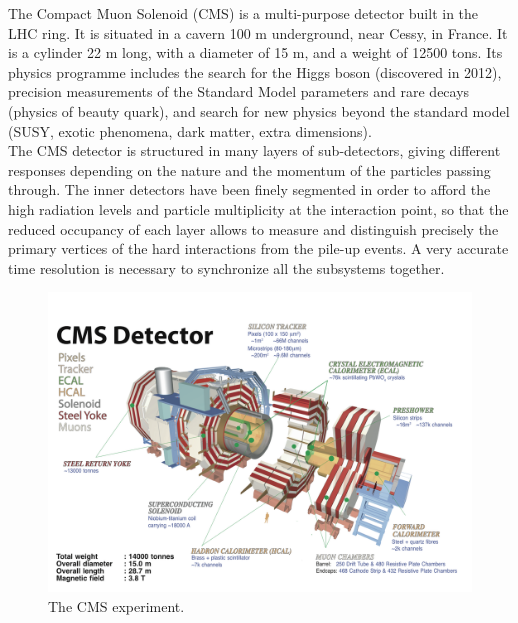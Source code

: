 The Compact Muon Solenoid (CMS) is a multi-purpose detector built in the LHC ring. It is situated in a cavern 100 m underground, near Cessy, in France. It is a cylinder 22 m long, with a diameter of 15 m, and a weight of 12500 tons. Its physics programme includes the search for the Higgs boson (discovered in 2012), precision measurements of the Standard Model parameters and rare decays (physics of beauty quark), and search for new physics beyond the standard model (SUSY, exotic phenomena, dark matter, extra dimensions).\\
The CMS detector is structured in many layers of sub-detectors, giving different responses depending on the nature and the momentum of the particles passing through. The inner detectors have been finely segmented in order to afford the high radiation levels and particle multiplicity at the interaction point, so that the reduced occupancy of each layer allows to measure and distinguish precisely the primary vertices of the hard interactions from the pile-up events. A very accurate time resolution is necessary to synchronize all the subsystems together.\\

\begin{figure}[!htb]
  \centering
    \includegraphics[width=.99\textwidth]{figures/cms_3d.png}
  \caption{The CMS experiment.}
  \label{fig:CMS_1}
\end{figure}

